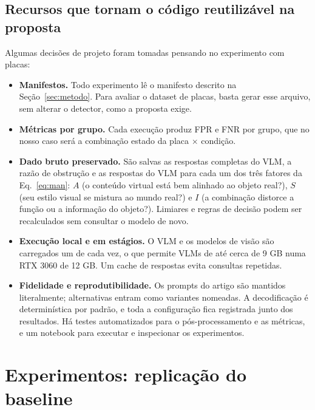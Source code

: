 \documentclass[journal,onecolumn]{IEEEtran}
\begin{document}
\subsection{Recursos que tornam o código reutilizável na proposta}
Algumas decisões de projeto foram tomadas pensando no experimento com placas:
\begin{itemize}
\item \textbf{Manifestos.} Todo experimento lê o manifesto descrito na Seção~\ref{sec:metodo}. Para
  avaliar o dataset de placas, basta gerar esse arquivo, sem alterar o detector, como a proposta
  exige.
\item \textbf{Métricas por grupo.} Cada execução produz FPR e FNR por grupo, que no nosso caso será a
  combinação estado da placa $\times$ condição.
\item \textbf{Dado bruto preservado.} São salvas as respostas completas do VLM, a razão de obstrução
  e as respostas do VLM para cada um dos três fatores da Eq.~\eqref{eq:man}: $A$ (o conteúdo virtual
  está bem alinhado ao objeto real?), $S$ (seu estilo visual se mistura ao mundo real?) e $I$ (a
  combinação distorce a função ou a informação do objeto?). Limiares e regras de decisão podem ser
  recalculados sem consultar o modelo de novo.
\item \textbf{Execução local e em estágios.} O VLM e os modelos de visão são carregados um de cada
  vez, o que permite VLMs de até cerca de 9 GB numa RTX 3060 de 12 GB. Um cache de respostas evita
  consultas repetidas.
\item \textbf{Fidelidade e reprodutibilidade.} Os prompts do artigo são mantidos literalmente;
  alternativas entram como variantes nomeadas. A decodificação é determinística por padrão, e toda a
  configuração fica registrada junto dos resultados. Há testes automatizados para o pós-processamento
  e as métricas, e um notebook para executar e inspecionar os experimentos.
\end{itemize}

\section{Experimentos: replicação do baseline}
\label{sec:exp}
\end{document}
